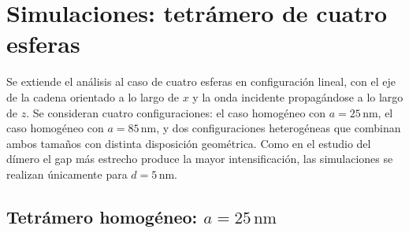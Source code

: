 \section{Simulaciones: tetrámero de cuatro esferas}
\label{sec:tetramero}

Se extiende el análisis al caso de cuatro esferas en configuración lineal,
con el eje de la cadena orientado a lo largo de $x$ y la onda incidente
propagándose a lo largo de $z$. Se consideran cuatro configuraciones:
el caso homogéneo con $a=25\,\text{nm}$, el caso homogéneo con
$a=85\,\text{nm}$, y dos configuraciones heterogéneas que combinan ambos
tamaños con distinta disposición geométrica. Como en el estudio del dímero 
el gap más estrecho produce la mayor intensificación, las simulaciones se 
realizan únicamente para $d=5\,\text{nm}$.

\subsection{Tetrámero homogéneo: $a = 25\,\text{nm}$}
\label{subsec:tetramero_a25}


